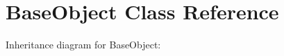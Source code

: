 \hypertarget{classBaseObject}{}\section{Base\+Object Class Reference}
\label{classBaseObject}


Inheritance diagram for Base\+Object\+:
